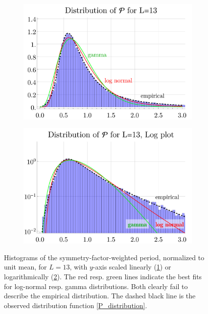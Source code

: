 \documentclass[11pt,a4paper]{article}
\renewcommand{\|}{\rule[-0.4ex]{0.2ex}{1.2em}}
\begin{document}
\begin{figure}[htbp]
	\begin{subfigure}[b]{.48 \textwidth}
		\includegraphics[width=\linewidth]{distribution_comparison}
		\subcaption{}
		\label{histograms_comparisonA}
	\end{subfigure}
	\begin{subfigure}[b]{.48 \textwidth}
		\includegraphics[width=\linewidth]{distribution_comparison_log}
		\subcaption{}
		\label{histograms_comparisonB}
	\end{subfigure}
	
	\caption{Histograms of the symmetry-factor-weighted period, normalized to unit mean, for $L=13$, with $y$-axis scaled linearly (\ref{histograms_comparisonA}) or logarithmically (\ref{histograms_comparisonB}). The red resp. green lines indicate the best fits for log-normal resp. gamma distributions. Both clearly fail to describe the empirical distribution. The dashed black line is the observed distribution function \cref{P_distribution}. }
	\label{fig:histograms_comparison}
\end{figure}
\end{document}
